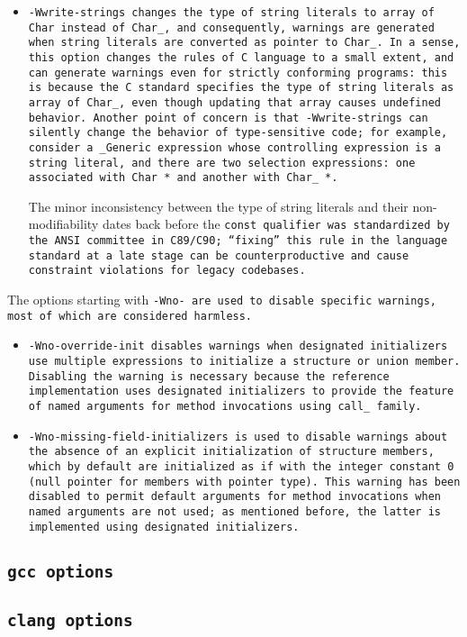 \begin{itemize}
\item \tt{-Wwrite-strings} changes the type of string literals to array
of \tt{Char} instead of \tt{Char_}, and consequently, warnings are
generated when string literals are converted as pointer to \tt{Char_}.
In a sense, this option changes the rules of C language to a small extent,
and can generate warnings even for strictly conforming programs:
this is because the C standard specifies the type of string literals as array
of \tt{Char_}, even though updating that array causes undefined behavior.
Another point of concern is that \tt{-Wwrite-strings} can silently change the
behavior of type-sensitive code; for example, consider a \tt{_Generic} expression
whose controlling expression is a string literal, and there are two selection
expressions: one associated with \tt{Char *} and another with \tt{Char_ *}.

\note\qquad The minor inconsistency between the type of string literals
and their non-modifiability dates back before the \tt{const}
qualifier was standardized by the ANSI committee in C89/C90;
``fixing'' this rule in the language standard at a late stage can be
counterproductive and cause constraint violations for legacy codebases.

\end{itemize}

The options starting with \tt{-Wno-} are used to disable
specific warnings, most of which are considered harmless.

\begin{itemize}

\item \tt{-Wno-override-init} disables warnings when designated initializers
use multiple expressions to initialize a structure or union member.
Disabling the warning is necessary because the reference
implementation uses designated initializers to provide the feature
of named arguments for method invocations using \tt{call_} family.

\item \tt{-Wno-missing-field-initializers} is used to disable warnings
about the absence of an explicit initialization of structure members,
which by default are initialized as if with the integer constant \tt{0}
(null pointer for members with pointer type).
This warning has been disabled to permit default arguments for method
invocations when named arguments are not used; as mentioned before,
the latter is implemented using designated initializers.

\end{itemize}

\enlargethispage*{\baselineskip}
\pagebreak

\subsection{\tt{gcc} options}


\subsection{\tt{clang} options}

